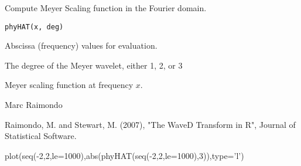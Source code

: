 \begin{Description}\relax
Compute Meyer Scaling function in the Fourier domain.
\end{Description}
\begin{Usage}
\begin{verbatim}
phyHAT(x, deg)
\end{verbatim}
\end{Usage}
\begin{Arguments}
\begin{ldescription}
\item[\code{x}] Abscissa (frequency) values for  evaluation.
\item[\code{deg}] The degree of the Meyer wavelet, either 1, 2, or 3 
\end{ldescription}
\end{Arguments}
\begin{Value}
Meyer scaling function at frequency $x$.
\end{Value}
\begin{Author}\relax
Marc Raimondo
\end{Author}
\begin{References}\relax
Raimondo, M. and Stewart, M. (2007),
"The WaveD Transform in R", Journal of Statistical Software.
\end{References}
\begin{SeeAlso}\relax
{}
\end{SeeAlso}
\begin{Examples}
\begin{ExampleCode}
plot(seq(-2,2,le=1000),abs(phyHAT(seq(-2,2,le=1000),3)),type='l')

\end{ExampleCode}
\end{Examples}

